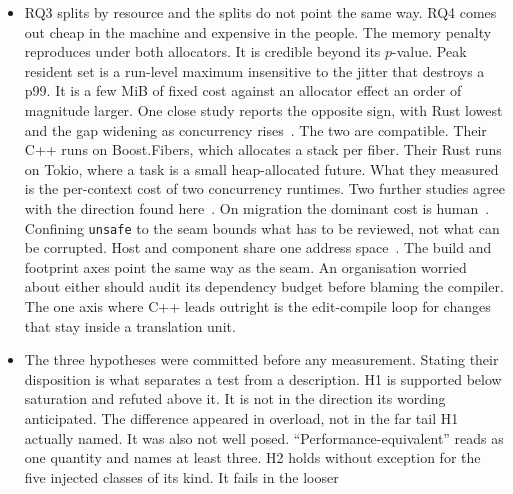 \documentclass[english,twoside,openright,a4paper,censored,csm,software-track-2020]{HYthesisML}
\begin{document}
\begin{itemize}
        called that path. That is the weakness of detection conditional on coverage. What turned
        undefined behaviour into a diagnosable failure on the Rust side was an ordinary bounds
        check, not a proof. The property worth budgeting for is ``checked by default'', not
        ``ruled out at compile time''. The root cause belongs to the method. A prohibition stated
        without a mechanism behind it leaves each implementation to fail in its own idiom.
  \item RQ3 splits by resource and the splits do not point the same way. RQ4 comes out cheap in
        the machine and expensive in the people. The memory penalty reproduces under both
        allocators. It is credible beyond its $p$-value. Peak resident set is a run-level
        maximum insensitive to the jitter that destroys a p99. It is a few MiB of fixed cost
        against an allocator effect an order of magnitude larger. One close study reports the
        opposite sign, with Rust lowest and the gap widening as concurrency
        rises~\cite{karlback2021ran}. The two are compatible. Their C++ runs on Boost.Fibers,
        which allocates a stack per fiber. Their Rust runs on Tokio, where a task is a small
        heap-allocated future. What they measured is the per-context cost of two concurrency
        runtimes. Two further studies agree with the direction found
        here~\cite{olsson2023ranmgmt,sundvisson2026drivers}. On migration the dominant cost is
        human~\cite{fulton2021adopting,crichton2024learning}. Confining \texttt{unsafe} to the
        seam bounds what has to be reviewed, not what can be corrupted. Host and component share
        one address space~\cite{rivera2021galeed,kirth2022pkrusafe}. The build and footprint axes
        point the same way as the seam. An organisation worried about either should audit its
        dependency budget before blaming the compiler. The one axis where C++ leads outright is
        the edit-compile loop for changes that stay inside a translation unit.
  \item The three hypotheses were committed before any measurement. Stating their disposition is
        what separates a test from a description. H1 is supported below saturation and refuted
        above it. It is not in the direction its wording anticipated. The difference appeared in
        overload, not in the far tail H1 actually named. It was also not well posed.
        ``Performance-equivalent'' reads as one quantity and names at least three. H2 holds
        without exception for the five injected classes of its kind. It fails in the looser

\end{itemize}
\end{document}
